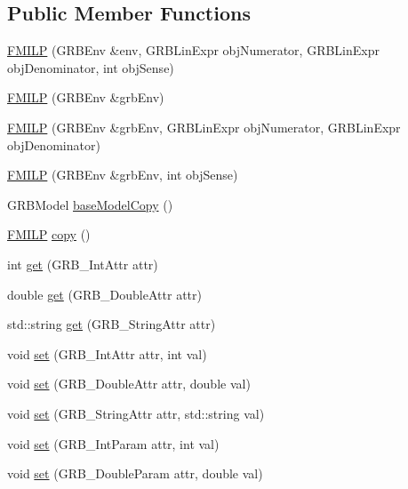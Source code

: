 \subsection*{Public Member Functions}
\begin{DoxyCompactItemize}
\item 
\hyperlink{classgrbfrc_1_1FMILP_ad1cd2043aeb83f2a8cedd6cb51c1a4eb}{F\+M\+I\+LP} (G\+R\+B\+Env \&env, G\+R\+B\+Lin\+Expr obj\+Numerator, G\+R\+B\+Lin\+Expr obj\+Denominator, int obj\+Sense)
\item 
\hyperlink{classgrbfrc_1_1FMILP_ad9adf272f045373e2bc0be41a336535f}{F\+M\+I\+LP} (G\+R\+B\+Env \&grb\+Env)
\item 
\hyperlink{classgrbfrc_1_1FMILP_ae4d4c0bf4a155daf065a0ec4a7480ed3}{F\+M\+I\+LP} (G\+R\+B\+Env \&grb\+Env, G\+R\+B\+Lin\+Expr obj\+Numerator, G\+R\+B\+Lin\+Expr obj\+Denominator)
\item 
\hyperlink{classgrbfrc_1_1FMILP_a7cf1bc41af845b97ac2f472bb0ca9538}{F\+M\+I\+LP} (G\+R\+B\+Env \&grb\+Env, int obj\+Sense)
\item 
G\+R\+B\+Model \hyperlink{classgrbfrc_1_1FMILP_afe58165f5407f1a3ce9bd36f2318cf34}{base\+Model\+Copy} ()
\item 
\hyperlink{classgrbfrc_1_1FMILP}{F\+M\+I\+LP} \hyperlink{classgrbfrc_1_1FMILP_a59dc03cc8a28516880d27261fc973778}{copy} ()
\item 
int \hyperlink{classgrbfrc_1_1FMILP_a5f74659534b60535f4cacce86ac94c23}{get} (G\+R\+B\+\_\+\+Int\+Attr attr)
\item 
double \hyperlink{classgrbfrc_1_1FMILP_af5523dfe96c9fbe427f33ebe5c1ff8cc}{get} (G\+R\+B\+\_\+\+Double\+Attr attr)
\item 
std\+::string \hyperlink{classgrbfrc_1_1FMILP_a3ceb90426d02ae98b1a4a0526b2de0fd}{get} (G\+R\+B\+\_\+\+String\+Attr attr)
\item 
void \hyperlink{classgrbfrc_1_1FMILP_a087ba9838a44e8cef68e82dede8ed802}{set} (G\+R\+B\+\_\+\+Int\+Attr attr, int val)
\item 
void \hyperlink{classgrbfrc_1_1FMILP_abe1a7a606a0f690cdd404e1a310803de}{set} (G\+R\+B\+\_\+\+Double\+Attr attr, double val)
\item 
void \hyperlink{classgrbfrc_1_1FMILP_a6a2f6a9477d67cbdc3aeff5791da1ad5}{set} (G\+R\+B\+\_\+\+String\+Attr attr, std\+::string val)
\item 
void \hyperlink{classgrbfrc_1_1FMILP_a5f02a9b7a33678f92903f7e329592622}{set} (G\+R\+B\+\_\+\+Int\+Param attr, int val)
\item 
void \hyperlink{classgrbfrc_1_1FMILP_adc96d11bddbc67a07470d681c2dac895}{set} (G\+R\+B\+\_\+\+Double\+Param attr, double val)

\end{DoxyCompactItemize}
